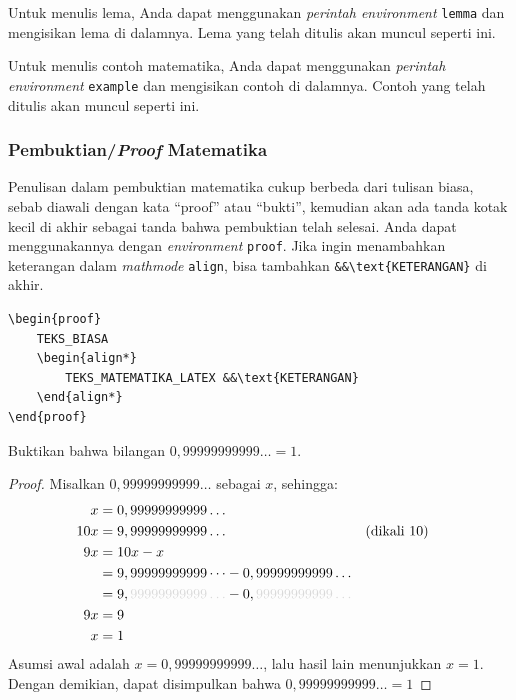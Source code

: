 \begin{lemma}
    Untuk menulis lema, Anda dapat menggunakan \textit{perintah environment} \texttt{lemma} dan mengisikan lema di dalamnya. Lema yang telah ditulis akan muncul seperti ini.
\end{lemma}

\begin{example}
    Untuk menulis contoh matematika, Anda dapat menggunakan \textit{perintah environment} \texttt{example} dan mengisikan contoh di dalamnya. Contoh yang telah ditulis akan muncul seperti ini.
\end{example}

\subsubsection{Pembuktian/\textit{Proof} Matematika}

Penulisan dalam pembuktian matematika cukup berbeda dari tulisan biasa, sebab diawali dengan kata ``proof'' atau ``bukti'', kemudian akan ada tanda kotak kecil di akhir sebagai tanda bahwa pembuktian telah selesai. Anda dapat menggunakannya dengan \textit{environment} \texttt{proof}. Jika ingin menambahkan keterangan dalam \textit{mathmode} \texttt{align}, bisa tambahkan \verb|&&\text{KETERANGAN}| di akhir.

\begin{lstlisting}[]
\begin{proof}
    TEKS_BIASA
    \begin{align*}
        TEKS_MATEMATIKA_LATEX &&\text{KETERANGAN}
    \end{align*}
\end{proof}
\end{lstlisting}

\noindent Buktikan bahwa bilangan $0,99999999999\dots = 1$.

\begin{proof}
    Misalkan $0,99999999999\dots$ sebagai $x$, sehingga:
    \begin{align*}
        x &= 0,99999999999\dots \\
        10x &= 9,99999999999\dots &&\text{(dikali 10)} \\
        9x &= 10x - x \\
        &= 9,99999999999\dots - 0,99999999999\dots \\
        &= 9,\textcolor{gray!30}{99999999999\dots} - 0,\textcolor{gray!30}{99999999999\dots} \\
        9x &= 9 \\
        x &= 1
    \end{align*}
    Asumsi awal adalah $x = 0,99999999999\dots$, lalu hasil lain menunjukkan $x = 1$. Dengan demikian, dapat disimpulkan bahwa $0,99999999999\dots = 1$
\end{proof}

